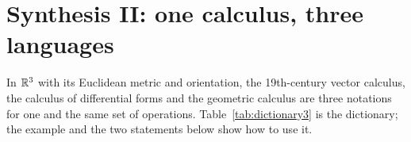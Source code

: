 \section{Synthesis II: one calculus, three languages}\label{sec:synth2}

\begin{synthesis}
In $\mathbb{R}^3$ with its Euclidean metric and orientation, the 19th-century vector calculus, the calculus of differential forms and the geometric calculus
are three notations for one and the same set of operations. Table~\ref{tab:dictionary3} is the dictionary; the example and the two statements below show how to use it.
\end{synthesis}





